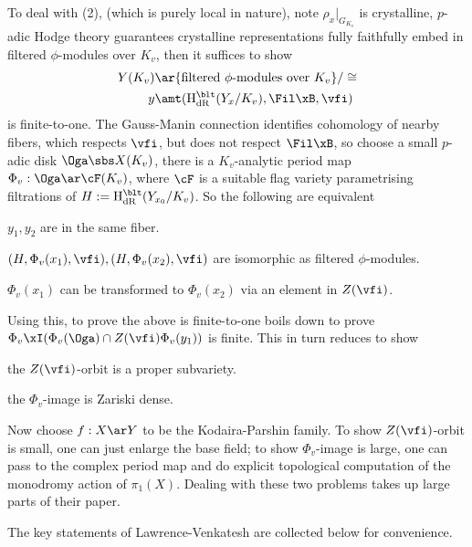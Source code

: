 \documentclass[a4paper, twoside]{article}
\begin{document}
\begin{ups}
	To deal with (2), (which is purely local in nature), note $\rho_{x}|_{G_{K_{v}}}$ is crystalline, $p$-adic Hodge theory guarantees crystalline representations fully faithfully embed in filtered $\phi$-modules over $K_{v}$, then it suffices to show
	\begin{align*}
	  Y(K_{v})&\ar \{\text{filtered $\phi$-modules over $K_{v}$}\}/\cong \\
	  y&\amt (\mathrm{H}_{\text{dR}}^{\blt}(Y_{x}/K_{v}),\Fil\xB,\vfi)
	\end{align*}
	is finite-to-one. The Gauss-Manin connection identifies cohomology of nearby fibers, which respects $\vfi$, but does not respect $\Fil\xB$, so choose a small $p$-adic disk $\Oga\sbs X(K_{v})$, there is a $K_{v}$-analytic period map $\Phi_{v}:\Oga\ar\cF(K_{v})$, where $\cF$ is a suitable flag variety parametrising filtrations of $H:=\mathrm{H}_{\text{dR}}^{\blt}(Y_{x_{0}}/K_{v})$. So the following are equivalent
	\begin{itm}
		\item $y_{1},y_{2}$ are in the same fiber.
		\item $(H,\Phi_{v}(x_{1}),\vfi), (H,\Phi_{v}(x_{2}),\vfi)$ are isomorphic as filtered $\phi$-modules.
		\item $\Phi_{v}(x_{1})$ can be transformed to $\Phi_{v}(x_{2})$ via an element in $Z(\vfi)$.
	\end{itm}
	Using this, to prove the above is finite-to-one boils down to prove $\Phi_{v}\xI(\Phi_{v}(\Oga)\cap Z(\vfi)\Phi_{v}(y_{1}))$ is finite. This in turn reduces to show
	\begin{enr}
		\item the $Z(\vfi)$-orbit is a proper subvariety.
		\item the $\Phi_{v}$-image is Zariski dense.
	\end{enr}
	Now choose $f:X\ar Y$ to be the Kodaira-Parshin family. To show $Z(\vfi)$-orbit is small, one can just enlarge the base field; to show $\Phi_{v}$-image is large, one can pass to the complex period map and do explicit topological computation of the monodromy action of $\pi_{1}(X)$. Dealing with these two problems takes up large parts of their paper.


	The key statements of Lawrence-Venkatesh are collected below for convenience.
\end{ups}


\end{document}
